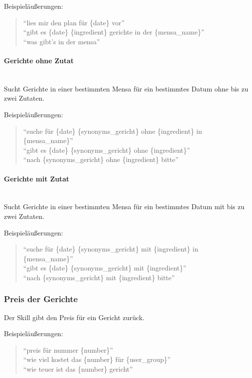 \documentclass[12pt]{article}
\begin{document}
Beispieläußerungen:
\begin{quote}
“lies mir den plan für \{date\} vor”\\
“gibt es \{date\} \{ingredient\} gerichte in der \{mensa\_name\}”\\
“was gibt's in der mensa”
\end{quote}

\paragraph{Gerichte ohne Zutat}~\\
Sucht Gerichte in einer bestimmten Mensa für ein bestimmtes Datum ohne bis zu zwei Zutaten.

Beispieläußerungen:
\begin{quote}
“suche für \{date\} \{synonyms\_gericht\} ohne \{ingredient\} in \{mensa\_name\}”\\
“gibt es \{date\} \{synonyms\_gericht\} ohne \{ingredient\}”\\
“nach \{synonyms\_gericht\} ohne \{ingredient\} bitte”\\
\end{quote} 

\paragraph{Gerichte mit Zutat}~\\
Sucht Gerichte in einer bestimmten Mensa für ein bestimmtes Datum mit bis zu zwei Zutaten. 

Beispieläußerungen:
\begin{quote}
“suche für \{date\} \{synonyms\_gericht\} mit \{ingredient\} in \{mensa\_name\}”\\
“gibt es \{date\} \{synonyms\_gericht\} mit \{ingredient\}”\\
“nach \{synonyms\_gericht\} mit \{ingredient\} bitte”\\
\end{quote}

\subsubsection{Preis der Gerichte}
Der Skill gibt den Preis für ein Gericht zurück.

Beispieläußerungen:
\begin{quote}
“preis für nummer \{number\}”\\
“wie viel kostet das \{number\} für \{user\_group\}”\\
“wie teuer ist das \{number\} gericht”\\
\end{quote}
\end{document}
